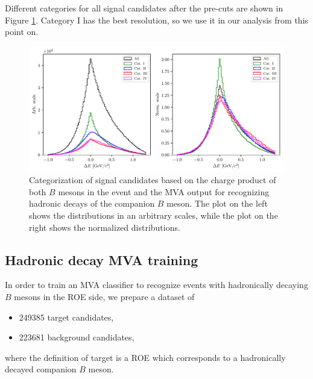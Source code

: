 \documentclass[  headings=standardclasses,
  headings=big,oneside,a4paper,openany,12pt]{scrbook}
\begin{document}
Different categories for all signal candidates after the pre-cuts are shown in Figure \ref{fig:sig_categ}. Category I has the best resolution, so we use it in our analysis from this point on.

\begin{figure}[H]
\centering
\captionsetup{width=0.8\linewidth}
\includegraphics[width=\linewidth]{fig/sig_categ}
\caption{Categorization of signal candidates based on the charge product of both $B$ mesons in the event and the MVA output for recognizing hadronic decays of the companion $B$ meson. The plot on the left shows the distributions in an arbitrary scales, while the plot on the right shows the normalized distributions.}
\label{fig:sig_categ}
\end{figure}


\subsection{Hadronic decay MVA training}
\label{subs:HDMVA}

In order to train an MVA classifier to recognize events with hadronically decaying $B$ mesons in the ROE side, we prepare a dataset of
\begin{itemize}
\item 249385 target candidates,
\item 223681 background candidates,
\end{itemize}
where the definition of target is a ROE which corresponds to a hadronically decayed companion $B$ meson. 
\end{document}
